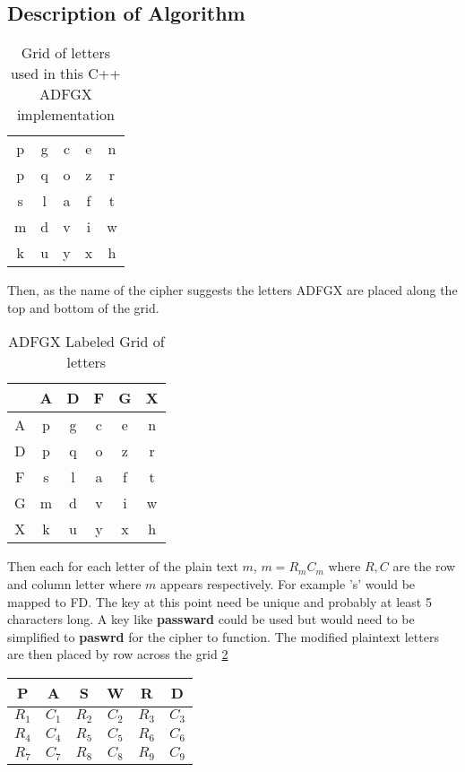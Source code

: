 \subsection{ Description of Algorithm }

\begin{table}[ht]
\centering
\begin{tabular}{ c c c c c }
p&g&c&e&n \\
p&q&o&z&r \\
s&l&a&f&t \\
m&d&v&i&w \\
k&u&y&x&h
\end{tabular}
\caption{Grid of letters used in this C++ ADFGX implementation}
\end{table}

Then, as the name of the cipher suggests the letters ADFGX are placed along the top and bottom of the grid. 

\begin{table}[ht]
\centering
\begin{tabular}{ c | c c c c c }
 & A&D&F&G&X\\
\hline
A& p&g&c&e&n \\
D& p&q&o&z&r \\
F& s&l&a&f&t \\
G& m&d&v&i&w \\
X& k&u&y&x&h
\end{tabular}
\caption{ADFGX Labeled Grid of letters}
\label{ADFGXGrid:1}
\end{table}

Then each for each letter of the plain text $m$, $m =R_mC_m$ where $R,C$ are the row and column letter where $m$ appears respectively.
For example 's' would be mapped to FD.
The key at this point need be unique and probably at least 5 characters long. A key like \textbf{passward} could be used but would need to be simplified to \textbf{paswrd} for the cipher to function.
The modified plaintext letters are then placed by row across the grid \ref{passwordgrid}

\begin{table}[ht]
\centering
\begin{tabular}{ c c c c c c }
 P& A&S&W&R&D\\
\hline
$R_1$& $C_1$&$R_2$&$C_2$&$R_3$&$C_3 $\\
$R_4$& $C_4$&$R_5$&$C_5$&$R_6$&$C_6 $\\
$R_7$& $C_7$&$R_8$&$C_8$&$R_9$&$C_9 $\\
\end{tabular}
\label{passwordgrid}
\end{table}

